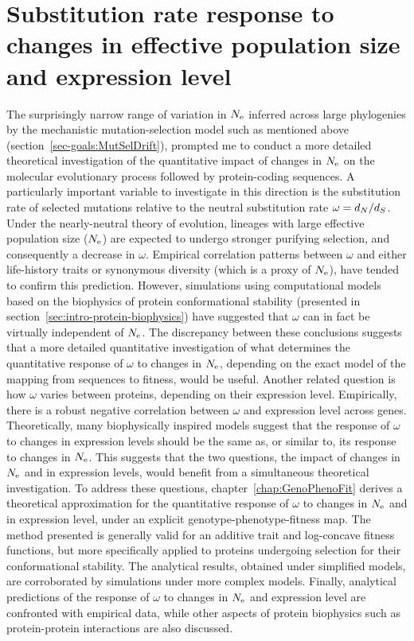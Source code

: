 \section{Substitution rate response to changes in effective population size and expression level}
\label{sec-goals:GenoPhenoFit}

The surprisingly narrow range of variation in $N_{\text{e}}$ inferred across large phylogenies by the mechanistic mutation-selection model such as mentioned above (section~\ref{sec-goals:MutSelDrift}), prompted me to conduct a more detailed theoretical investigation of the quantitative impact of changes in $N_{\text{e}}$ on the molecular evolutionary process followed by protein-coding sequences.
A particularly important variable to investigate in this direction is the substitution rate of selected mutations relative to the neutral substitution rate $\omega = d_N / d_S$.
Under the nearly-neutral theory of evolution, lineages with large effective population size ($N_{\text{e}}$) are expected to undergo stronger purifying selection, and consequently a decrease in $\omega$.
Empirical correlation patterns between $\omega$ and either life-history traits or synonymous diversity (which is a proxy of $N_{\text{e}}$), have tended to confirm this prediction.
However, simulations using computational models based on the biophysics of protein conformational stability (presented in section~\ref{sec:intro-protein-biophysics}) have suggested that $\omega$ can in fact be virtually independent of $N_{\text{e}}$.
The discrepancy between these conclusions suggests that a more detailed quantitative investigation of what determines the quantitative response of $\omega$ to changes in $N_{\text{e}}$, depending on the exact model of the mapping from sequences to fitness, would be useful.
Another related question is how $\omega$ varies between proteins, depending on their expression level.
Empirically, there is a robust negative correlation between $\omega$ and expression level across genes.
Theoretically, many biophysically inspired models suggest that the response of $\omega$ to changes in expression levels should be the same as, or similar to, its response to changes in $N_{\text{e}}$.
This suggests that the two questions, the impact of changes in $N_{\text{e}}$ and in expression levels, would benefit from a simultaneous theoretical investigation.
To address these questions, chapter~\ref{chap:GenoPhenoFit} derives a theoretical approximation for the quantitative response of $\omega$ to changes in $N_{\text{e}}$ and in expression level, under an explicit genotype-phenotype-fitness map.
The method presented is generally valid for an additive trait and log-concave fitness functions, but more specifically applied to proteins undergoing selection for their conformational stability.
The analytical results, obtained under simplified models, are corroborated by simulations under more complex models.
Finally, analytical predictions of the response of $\omega$ to changes in $N_{\text{e}}$ and expression level are confronted with empirical data, while other aspects of protein biophysics such as protein-protein interactions are also discussed.